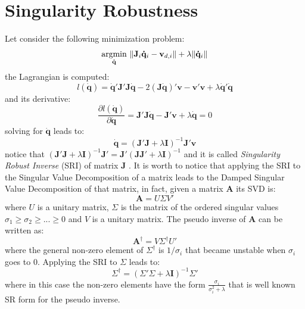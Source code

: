 \section{Singularity Robustness}
\label{app:singularity-robustness}

Let consider the following minimization problem:
\begin{equation} 
\label{SRI_problem}
\begin{array}{c}
\underset{\mathbf{\dot{q}}}{\operatorname{argmin}} \ \Arrowvert \mathbf{J}_i \mathbf{\dot{q}}_i-\mathbf{v}_{d,i} \Arrowvert + \lambda \Arrowvert \mathbf{\dot{q}}_i \Arrowvert
\end{array}
\end{equation}
the Lagrangian is computed:
\begin{equation}
\label{SRI_Lagrangian}
l(\mathbf{\dot{q}}) = \mathbf{\dot{q}}'\mathbf{J}'\mathbf{J}\mathbf{\dot{q}}-2(\mathbf{J}\mathbf{\dot{q}})'\mathbf{v}-\mathbf{v}'\mathbf{v}+\lambda\mathbf{\dot{q}}'\mathbf{\dot{q}}
\end{equation}
and its derivative:
\begin{equation}
\label{derive_SRI_Lagrangian}
\frac{\partial l(\mathbf{\dot{q}})}{\partial\mathbf{\dot{q}}}=\mathbf{J}'\mathbf{J}\mathbf{\dot{q}}-\mathbf{J}'\mathbf{v}+\lambda\mathbf{\dot{q}}=0
\end{equation}
solving for $\dot{\mathbf{q}}$ leads to:
\begin{equation}
\label{SRI}
\mathbf{\dot{q}}=(\mathbf{J}'\mathbf{J}+\lambda\mathbf{I})^{-1}\mathbf{J}'\mathbf{v}
\end{equation}
notice that $(\mathbf{J}'\mathbf{J}+\lambda\mathbf{I})^{-1}\mathbf{J}' = \mathbf{J}'(\mathbf{J}\mathbf{J}'+\lambda\mathbf{I})^{-1}$ and it is called \emph{Singularity Robust Inverse} (SRI) of matrix $\mathbf{J}$ \cite{Nakamura1990-tp}.
It is worth to notice that applying the SRI to the Singular Value Decomposition of a matrix leads to the Damped Singular Value Decomposition of that matrix, in fact, given a matrix $\mathbf{A}$ its SVD is:
\begin{equation}
\mathbf{A} = U\Sigma V'
\end{equation}
where $U$ is a unitary matrix, $\Sigma$ is the matrix of the ordered singular values $\sigma_1 \geq \sigma_2 \geq ... \geq 0$ and $V$ is a unitary matrix. The pseudo inverse of $\mathbf{A}$ can be written as:
\begin{equation}
\mathbf{A}^{\dagger} = V\Sigma^{\dagger}U'
\end{equation}
where the general non-zero element of $\Sigma^{\dagger}$ is $1/\sigma_i$ that became unstable when $\sigma_i$ goes to 0. Applying the SRI to $\Sigma$ leads to:
\begin{equation}
\Sigma^{\dagger} = (\Sigma'\Sigma+\lambda\mathbf{I})^{-1}\Sigma'
\end{equation}
where in this case the non-zero elements have the form $\frac{\sigma_i}{\sigma_i^2+\lambda}$ that is well known \cite{Maciejewski1989-jp} SR form for the pseudo inverse.

